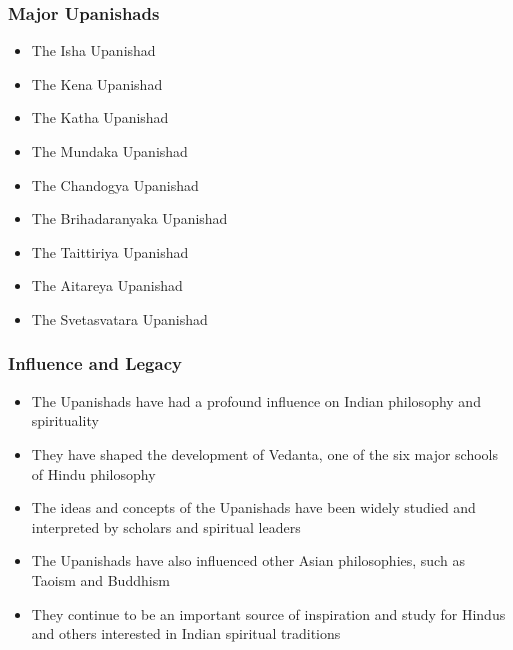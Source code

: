 \begin{frame}[fragile]\frametitle{Major Upanishads}
    \begin{itemize}
        \item The Isha Upanishad
        \item The Kena Upanishad
        \item The Katha Upanishad
        \item The Mundaka Upanishad
        \item The Chandogya Upanishad
        \item The Brihadaranyaka Upanishad
        \item The Taittiriya Upanishad
        \item The Aitareya Upanishad
        \item The Svetasvatara Upanishad
    \end{itemize}
\end{frame}

\begin{frame}[fragile]\frametitle{Influence and Legacy}
    \begin{itemize}
        \item The Upanishads have had a profound influence on Indian philosophy and spirituality
        \item They have shaped the development of Vedanta, one of the six major schools of Hindu philosophy
        \item The ideas and concepts of the Upanishads have been widely studied and interpreted by scholars and spiritual leaders
        \item The Upanishads have also influenced other Asian philosophies, such as Taoism and Buddhism
        \item They continue to be an important source of inspiration and study for Hindus and others interested in Indian spiritual traditions
    \end{itemize}
\end{frame}
